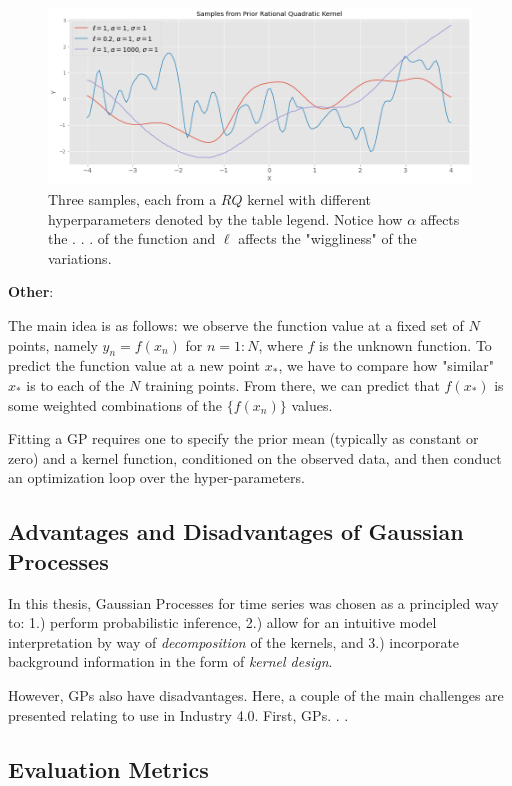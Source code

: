 \begin{figure}[htp]
\centering
\graphicspath{ {./images/} }
\includegraphics[scale=0.49]{images/samples_rq_prior.png}
\caption{Three samples, each from a $RQ$ kernel with different hyperparameters denoted by the table legend. Notice how $\alpha$ affects the . . . of the function and $\ell$ affects the "wiggliness" of the variations.}
\end{figure}




\textbf{Other}:

The main idea is as follows: we observe the function value at a fixed set of $N$ points, namely $y_n = f(x_n)$ for $n=1:N$, where $f$ is the unknown function. To predict the function value at a new point $x_*$, we have to compare how "similar" $x_*$ is to each of the $N$ training points. From there, we can predict that $f(x_*)$ is some weighted combinations of the $\{f(x_n)\}$ values.

Fitting a GP requires one to specify the prior mean (typically as constant or zero) and a kernel function, conditioned on the observed data, and then conduct an optimization loop over the hyper-parameters.


\subsection{Advantages and Disadvantages of Gaussian Processes}

In this thesis, Gaussian Processes for time series was chosen as a principled way to: 1.) perform probabilistic inference, 2.) allow for an intuitive model interpretation by way of \textit{decomposition} of the kernels, and 3.) incorporate background information in the form of \textit{kernel design}. 

However, GPs also have disadvantages. Here, a couple of the main challenges are presented relating to use in Industry 4.0. First, GPs. . .

\subsection{Evaluation Metrics}

